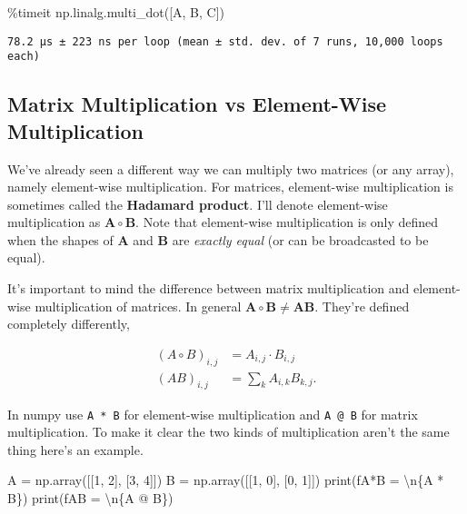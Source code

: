 \documentclass[
  letterpaper,
  DIV=11,
  numbers=noendperiod]{scrreprt}
\newenvironment{Shaded}{\begin{snugshade}}{\end{snugshade}}
\newcommand{\BuiltInTok}[1]{\textcolor[rgb]{0.00,0.23,0.31}{#1}}
\newcommand{\CharTok}[1]{\textcolor[rgb]{0.13,0.47,0.30}{#1}}
\newcommand{\DecValTok}[1]{\textcolor[rgb]{0.68,0.00,0.00}{#1}}
\newcommand{\NormalTok}[1]{\textcolor[rgb]{0.00,0.23,0.31}{#1}}
\newcommand{\OperatorTok}[1]{\textcolor[rgb]{0.37,0.37,0.37}{#1}}
\newcommand{\SpecialCharTok}[1]{\textcolor[rgb]{0.37,0.37,0.37}{#1}}
\newcommand{\SpecialStringTok}[1]{\textcolor[rgb]{0.13,0.47,0.30}{#1}}
\begin{document}
\begin{Shaded}
\begin{Highlighting}[]
\OperatorTok{\%}\NormalTok{timeit np.linalg.multi\_dot([A, B, C])}
\end{Highlighting}
\end{Shaded}

\begin{verbatim}
78.2 µs ± 223 ns per loop (mean ± std. dev. of 7 runs, 10,000 loops each)
\end{verbatim}

\hypertarget{matrix-multiplication-vs-element-wise-multiplication}{%
\subsection{Matrix Multiplication vs Element-Wise
Multiplication}\label{matrix-multiplication-vs-element-wise-multiplication}}

We've already seen a different way we can multiply two matrices (or any
array), namely element-wise multiplication. For matrices, element-wise
multiplication is sometimes called the \textbf{Hadamard product}. I'll
denote element-wise multiplication as \(\mathbf{A} \circ \mathbf{B}\).
Note that element-wise multiplication is only defined when the shapes of
\(\mathbf{A}\) and \(\mathbf{B}\) are \emph{exactly equal} (or can be
broadcasted to be equal).

It's important to mind the difference between matrix multiplication and
element-wise multiplication of matrices. In general
\(\mathbf{A} \circ \mathbf{B} \neq \mathbf{A} \mathbf{B}\). They're
defined completely differently,

\begin{align*}
(A \circ B)_{i,j} &= A_{i,j} \cdot B_{i,j} \\
(AB)_{i,j} &= \sum_k A_{i,k}B_{k,j}.
\end{align*}

In numpy use \texttt{A\ *\ B} for element-wise multiplication and
\texttt{A\ @\ B} for matrix multiplication. To make it clear the two
kinds of multiplication aren't the same thing here's an example.

\begin{Shaded}
\begin{Highlighting}[]
\NormalTok{A }\OperatorTok{=}\NormalTok{ np.array([[}\DecValTok{1}\NormalTok{, }\DecValTok{2}\NormalTok{], [}\DecValTok{3}\NormalTok{, }\DecValTok{4}\NormalTok{]])}
\NormalTok{B }\OperatorTok{=}\NormalTok{ np.array([[}\DecValTok{1}\NormalTok{, }\DecValTok{0}\NormalTok{], [}\DecValTok{0}\NormalTok{, }\DecValTok{1}\NormalTok{]])}
\BuiltInTok{print}\NormalTok{(}\SpecialStringTok{f\textquotesingle{}A*B = }\CharTok{\textbackslash{}n}\SpecialCharTok{\{}\NormalTok{A }\OperatorTok{*}\NormalTok{ B}\SpecialCharTok{\}}\SpecialStringTok{\textquotesingle{}}\NormalTok{)}
\BuiltInTok{print}\NormalTok{(}\SpecialStringTok{f\textquotesingle{}AB = }\CharTok{\textbackslash{}n}\SpecialCharTok{\{}\NormalTok{A }\OperatorTok{@}\NormalTok{ B}\SpecialCharTok{\}}\SpecialStringTok{\textquotesingle{}}\NormalTok{)}
\end{Highlighting}
\end{Shaded}
\end{document}

